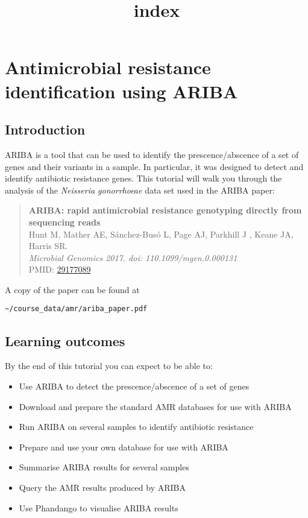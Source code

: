 \documentclass[11pt]{article}
\title{index}
\providecommand{\tightlist}{%
      \setlength{\itemsep}{0pt}\setlength{\parskip}{0pt}}
\begin{document}
    \hypertarget{antimicrobial-resistance-identification-using-ariba}{%
\section{Antimicrobial resistance identification using
ARIBA}\label{antimicrobial-resistance-identification-using-ariba}}

\hypertarget{introduction}{%
\subsection{Introduction}\label{introduction}}

ARIBA is a tool that can be used to identify the prescence/abscence of a
set of genes and their variants in a sample. In particular, it was
designed to detect and identify antibiotic resistance genes. This
tutorial will walk you through the analysis of the \textit{Neisseria
gonorrhoeae} data set used in the ARIBA paper:

\begin{quote}
\textbf{ARIBA: rapid antimicrobial resistance genotyping directly from
sequencing reads}\\
Hunt M, Mather AE, Sánchez-Busó L, Page AJ, Parkhill J , Keane JA,
Harris SR.\\
\textit{Microbial Genomics 2017. doi: 110.1099/mgen.0.000131}\\
PMID:
\href{https://www.ncbi.nlm.nih.gov/pmc/articles/PMC5695208/}{29177089}
\end{quote}

A copy of the paper can be found at

\texttt{\textasciitilde{}/course\_data/amr/ariba\_paper.pdf}

\hypertarget{learning-outcomes}{%
\subsection{Learning outcomes}\label{learning-outcomes}}

By the end of this tutorial you can expect to be able to:

\begin{itemize}
\tightlist
\item
  Use ARIBA to detect the prescence/abscence of a set of genes
\item
  Download and prepare the standard AMR databases for use with ARIBA
\item
  Run ARIBA on several samples to identify antibiotic resistance
\item
  Prepare and use your own database for use with ARIBA
\item
  Summarise ARIBA results for several samples
\item
  Query the AMR results produced by ARIBA
\item
  Use Phandango to visualise ARIBA results
\end{itemize}
\end{document}
